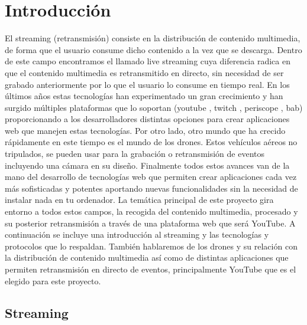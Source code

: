 \chapter{Introducción}

El streaming (retransmisión) consiste en la distribución de contenido multimedia, de forma que el usuario consume dicho contenido a la vez que se descarga. Dentro de este campo encontramos el llamado live streaming cuya diferencia radica en que el contenido multimedia es retransmitido en directo, sin necesidad de ser grabado anteriormente por lo que el usuario lo consume en tiempo real.
En los últimos años estas tecnologías han experimentado un gran crecimiento y han surgido múltiples plataformas que lo soportan (youtube , twitch , periscope , bab) proporcionando a los desarrolladores distintas opciones para crear aplicaciones web que manejen estas tecnologías.
Por otro lado, otro mundo que ha crecido rápidamente en este tiempo es el mundo de los drones. Estos vehículos aéreos no tripulados, se pueden usar para la grabación o retransmisión de eventos incluyendo una cámara en su diseño.
Finalmente todos estos avances van de la mano del desarrollo de tecnologías web que permiten crear aplicaciones cada vez más sofisticadas y potentes aportando nuevas funcionalidades sin la necesidad de instalar nada en tu ordenador.
La temática principal de este proyecto gira entorno a todos estos campos, la recogida del contenido multimedia, procesado y su posterior retransmisión a través de una plataforma web que será YouTube.
A continuación se incluye una introducción al streaming y las tecnologías y protocolos que lo respaldan. También hablaremos de los drones y su relación con la distribución de contenido multimedia así como de distintas aplicaciones que permiten retransmisión en directo de eventos, principalmente YouTube que es el elegido para este proyecto.

\section{Streaming}

